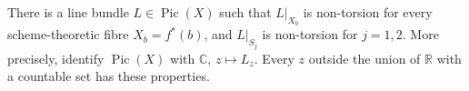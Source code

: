 \begin{theorem}
\hypertarget{tag-03DQ}{}\label{wb:thm:uniform-nontorsion-audit}
\hypertarget{tag-01TQ}{}\label{inv:wb:uniform-nontorsion-provenance}

There is a line bundle \(L\in\operatorname{Pic}(X)\) such that
\(L|_{X_b}\) is non-torsion for every scheme-theoretic fibre
\(X_b=f^*(b)\), and \(L|_{S_j}\) is non-torsion for \(j=1,2\).
More precisely, identify \(\operatorname{Pic}(X)\) with \(\mathbb C\),
\(z\mapsto L_z\).  Every \(z\) outside the union of \(\mathbb R\) with a
countable set has these properties.
\end{theorem}



